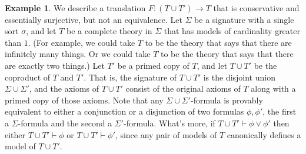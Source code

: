 \documentclass[12pt]{article}
\theoremstyle{definition}
\newtheorem{example}[prop]{Example}
\theoremstyle{remark}
\newcommand{\3}{\mathcal}
\begin{document}
\begin{example} \label{nope} We describe a translation
  $F:(T\cup T')\to T$ that is conservative and essentially surjective,
  but not an equivalence. Let $\Sigma$ be a signature with a single
  sort $\sigma$, and let $T$ be a complete theory in $\Sigma$ that has
  models of cardinality greater than $1$. (For example, we could take
  $T$ to be the theory that says that there are infinitely many
  things. Or we could take $T$ to be the theory that says that there
  are exactly two things.)  Let $T'$ be a primed copy of $T$, and let
  $T\cup T'$ be the coproduct of $T$ and $T'$. That is, the signature
  of $T\cup T'$ is the disjoint union $\Sigma \cup \Sigma '$, and the
  axioms of $T\cup T'$ consist of the original axioms of $T$ along
  with a primed copy of those axioms. Note that any
  $\Sigma\cup\Sigma '$-formula is provably equivalent to either a
  conjunction or a disjunction of two formulas $\phi ,\phi '$, the
  first a $\Sigma$-formula and the second a $\Sigma '$-formula. What's
  more, if $T\cup T'\vdash \phi \vee \phi '$ then either
  $T\cup T'\vdash\phi$ or $T\cup T'\vdash \phi '$, since any pair of
  models of $T$ canonically defines a model of $T\cup T'$.


\end{example}
\end{document}
